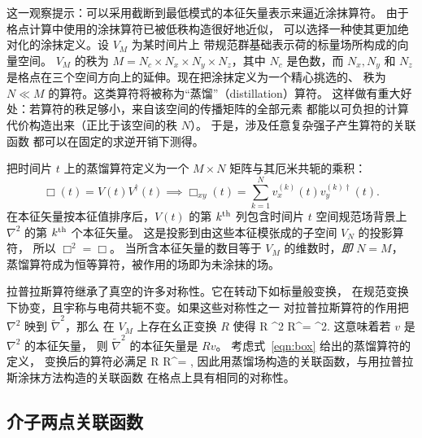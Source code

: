 这一观察提示：可以采用截断到最低模式的本征矢量表示来逼近涂抹算符。
由于格点计算中使用的涂抹算符已被低秩构造很好地近似，
可以选择一种使其更加绝对化的涂抹定义。设 $V_M$ 为某时间片上
带规范群基础表示荷的标量场所构成的向量空间。
$V_M$ 的秩为 $M = N_c \times N_x \times
N_y \times N_z$，其中 $N_c$ 是色数，而 $N_x,N_y$ 和 $N_z$
是格点在三个空间方向上的延伸。现在把涂抹定义为一个精心挑选的、
秩为 $N \ll M$ 的算符。这类算符将被称为``蒸馏''（distillation）算符。
这样做有重大好处：若算符的秩足够小，来自该空间的传播矩阵的全部元素
都能以可负担的计算代价构造出来（正比于该空间的秩 $N$）。
于是，涉及任意复杂强子产生算符的关联函数
都可以在固定的求逆开销下测得。

把时间片 $t$ 上的蒸馏算符定义为一个 $M \times
N$ 矩阵与其厄米共轭的乘积：
\begin{equation}
 \Box(t) = V(t) V^\dagger(t)
\implies \Box_{xy}(t) = \sum_{k=1}^N v_x^{(k)} (t) v_y^{(k)\dag} (t).
    \label{eqn:box}
\end{equation}
在本征矢量按本征值排序后，$V(t)$ 的第 $k^{\rm th}$ 列包含时间片 $t$
空间规范场背景上 $\nabla^2$ 的第 $k^{\rm th}$ 个本征矢量。
这是投影到由这些本征模张成的子空间 $V_N$ 的投影算符，
所以 $\Box^2 = \Box$。
当所含本征矢量的数目等于 $V_M$ 的维数时，{\em 即} $N = M$，
蒸馏算符成为恒等算符，被作用的场即为未涂抹的场。

拉普拉斯算符继承了真空的许多对称性。它在转动下如标量般变换，
在规范变换下协变，且宇称与电荷共轭不变。如果这些对称性之一
对拉普拉斯算符的作用把 $\nabla^2 $ 映到 $\tilde\nabla^2$，那么
在 $V_M$ 上存在幺正变换 $R$ 使得
\beq
R \tilde\nabla^2 R^\dagger = \nabla^2.
\eeq
这意味着若 $v$ 是 $\nabla^2$ 的本征矢量，
则 $\tilde\nabla^2$ 的本征矢量是 $R v$。
考虑式~\ref{eqn:box} 给出的蒸馏算符的定义，
变换后的算符必满足
\beq
R \stackrel{\sim}{\Box} R^\dagger = \Box,
\eeq
因此用蒸馏场构造的关联函数，与用拉普拉斯涂抹方法构造的关联函数
在格点上具有相同的对称性。

\subsection{介子两点关联函数}\label{subsec:theory-mesons}

